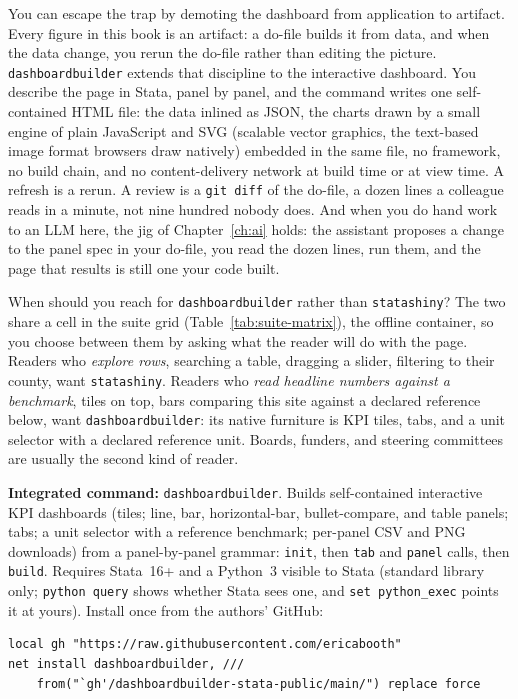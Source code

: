 \documentclass[
    a4paper,
    fontsize=10pt,
    twoside=true,
    numbers=noenddot,
]{kaobook}
\begin{document}
You can escape the trap by demoting the dashboard from application to artifact. Every figure in this book is an artifact: a do-file builds it from data, and when the data change, you rerun the do-file rather than editing the picture. \texttt{dashboardbuilder} extends that discipline to the interactive dashboard. You describe the page in Stata, panel by panel, and the command writes one self-contained HTML file: the data inlined as JSON, the charts drawn by a small engine of plain JavaScript and SVG (scalable vector graphics, the text-based image format browsers draw natively) embedded in the same file, no framework, no build chain, and no content-delivery network at build time or at view time. A refresh is a rerun. A review is a \texttt{git diff} of the do-file, a dozen lines a colleague reads in a minute, not nine hundred nobody does. And when you do hand work to an LLM here, the jig of Chapter~\ref{ch:ai} holds: the assistant proposes a change to the panel spec in your do-file, you read the dozen lines, run them, and the page that results is still one your code built.

When should you reach for \texttt{dashboardbuilder} rather than \texttt{statashiny}? The two share a cell in the suite grid (Table~\ref{tab:suite-matrix}), the offline container, so you choose between them by asking what the reader will do with the page. Readers who \emph{explore rows}, searching a table, dragging a slider, filtering to their county, want \texttt{statashiny}. Readers who \emph{read headline numbers against a benchmark}, tiles on top, bars comparing this site against a declared reference below, want \texttt{dashboardbuilder}: its native furniture is KPI tiles, tabs, and a unit selector with a declared reference unit. Boards, funders, and steering committees are usually the second kind of reader.

\begin{kaobox}[frametitle=Package Integration: \texttt{dashboardbuilder}]
\textbf{Integrated command:} \texttt{dashboardbuilder}. Builds self-contained interactive KPI dashboards (tiles; line, bar, horizontal-bar, bullet-compare, and table panels; tabs; a unit selector with a reference benchmark; per-panel CSV and PNG downloads) from a panel-by-panel grammar: \texttt{init}, then \texttt{tab} and \texttt{panel} calls, then \texttt{build}. Requires Stata~16+ and a Python~3 visible to Stata (standard library only; \texttt{python query} shows whether Stata sees one, and \texttt{set python\_exec} points it at yours). Install once from the authors' GitHub:
\par
{\footnotesize
\begin{verbatim}
local gh "https://raw.githubusercontent.com/ericabooth"
net install dashboardbuilder, ///
    from("`gh'/dashboardbuilder-stata-public/main/") replace force
\end{verbatim}
}
\end{kaobox}
\end{document}
